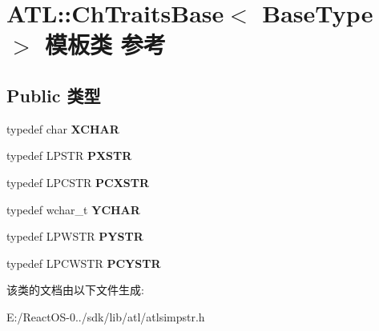 \hypertarget{class_a_t_l_1_1_ch_traits_base}{}\section{A\+TL\+:\+:Ch\+Traits\+Base$<$ Base\+Type $>$ 模板类 参考}
\label{class_a_t_l_1_1_ch_traits_base}
\subsection*{Public 类型}
\begin{DoxyCompactItemize}
\item 
\mbox{\label{class_a_t_l_1_1_ch_traits_base_aab3606c8b82d50b4e81c1fbebba8cd61}} 
typedef char {\bfseries X\+C\+H\+AR}
\item 
\mbox{\label{class_a_t_l_1_1_ch_traits_base_abac6ad263bbdbd2d96659fbb8580189e}} 
typedef L\+P\+S\+TR {\bfseries P\+X\+S\+TR}
\item 
\mbox{\label{class_a_t_l_1_1_ch_traits_base_ad8b271c0d36ad6cf2045233d07d7efb4}} 
typedef L\+P\+C\+S\+TR {\bfseries P\+C\+X\+S\+TR}
\item 
\mbox{\label{class_a_t_l_1_1_ch_traits_base_a443445ff0ffa23c655903165b8a33349}} 
typedef wchar\+\_\+t {\bfseries Y\+C\+H\+AR}
\item 
\mbox{\label{class_a_t_l_1_1_ch_traits_base_a5558659b31f991db6a4c5c373a9728d8}} 
typedef L\+P\+W\+S\+TR {\bfseries P\+Y\+S\+TR}
\item 
\mbox{\label{class_a_t_l_1_1_ch_traits_base_a9c43ccc5f2019e7998cb62baf33ca00c}} 
typedef L\+P\+C\+W\+S\+TR {\bfseries P\+C\+Y\+S\+TR}
\end{DoxyCompactItemize}


该类的文档由以下文件生成\+:\begin{DoxyCompactItemize}
\item 
E\+:/\+React\+O\+S-\/0../sdk/lib/atl/atlsimpstr.\+h\end{DoxyCompactItemize}
